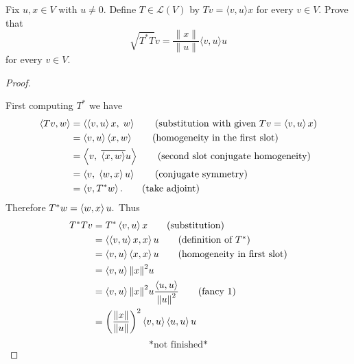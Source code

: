 Fix $u,  x \in V$ with $u \ne 0$. Define $T \in \mathcal{L}(V)$ by $Tv = \langle v , u \rangle x$ for every $v \in V$.  Prove that
    \[
      \sqrt{T^*T}v = \frac{\| x \|}{\| u \|} \langle v , u \rangle u
    \]
for every $v \in V$.

\begin{proof} $ $

  \nl First computing $T^*$ we have 
  \begin{align*}
    \inner{Tv, w} &= \inner{ \inner{v,u}x, \; w} \tag{substitution with given $Tv = \inner{v,u}x$}\\
    &= \inner{v,u}\inner{x,w} \tag{homogeneity in the first slot}\\
    &= \inner{v,\;\innerconj{x,w} u} \tag{second slot conjugate homogeneity}\\
    &= \inner{v,\; \inner{w,x}u} \tag{conjugate symmetry}\\
    &= \inner{v, T^*w}. \tag{take adjoint}
  \end{align*}
  Therefore $T^*w = \inner{w,x}u.$ Thus 
  \begin{align*}
    T^*Tv &= T^*\inner{v,u}x \tag{substitution}\\
    &= \inner{ \inner{v,u}x,x}u \tag{definition of $T^*$}\\
    &= \inner{v,u} \inner{x,x}u \tag{homogeneity in first slot}\\
    &= \inner{v,u} \norm{x}^2 u \\
    &= \inner{v,u} \norm{x}^2 u \frac{\inner{u,u}}{\norm{u}^2} \tag{fancy 1}\\
    &= \pfrac{\norm{x}}{\norm{u}}^2 \inner{v,u} \inner{u,u}u
  \end{align*}
  $$\text{*not finished*}$$
\end{proof}
